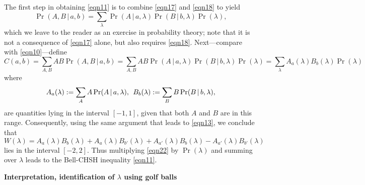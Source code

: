 \documentclass[10pt]{article} %
\def\outl#1{\par{\medskip\noindent\hspace*{.5cm}\bf
      \mathversion{bold}#1\mathversion{normal}\smallskip} }
\def\np{} \def\xa{} \def\xb{} \def\xn{} \def\xp{}
\def\outl#1{} \def\np{} \def\xa{} \def\xb{} \def\xn{} \def\xp{}
\def\outl#1{\par{\medskip\noindent\hspace*{.5cm}\bf
      \mathversion{bold}#1\mathversion{normal}\smallskip} }
\def\np{\newpage }\def\xn{\nopagebreak }\def\xp{\pagebreak }
\newcommand{\hquad}{\mspace{8 mu}}
\newcommand{\vb}{\,|\,}
\newcommand{\lm}{\lambda }
\begin{document}
The first step in obtaining \eqref{eqn11} is to combine
\eqref{eqn17} and \eqref{eqn18} to yield
\begin{equation}
  \Pr(A,B\vb a,b) = \sum_\lm \Pr(A\vb a,\lm) \Pr(B\vb b,\lm) \Pr(\lm),
\label{eqn19}
\end{equation}
which we leave to the reader as an exercise in probability theory; note that
it is not a consequence of \eqref{eqn17} alone, but also requires
\eqref{eqn18}.
%
Next---compare with \eqref{eqn10}---define
\begin{equation}
C(a,b) = \sum_{A,B} AB\Pr(A,B\vb a,b)
  = \sum_{A,B} AB\Pr(A\vb a,\lm)\Pr(B\vb b,\lm) \Pr(\lm)
 = \sum_\lm  A_a(\lm) B_b(\lm) \Pr(\lm)
\label{eqn20}
\end{equation}
where
\begin{equation}
  A_a(\lm) := \sum_A A \Pr(A\vb a,\lm),\hquad
  B_b(\lm) := \sum_B B \Pr(B\vb b,\lm),
\label{eqn21}
\end{equation}
are quantities lying in the interval $[-1,1]$, given that both $A$ and $B$ are
in this range. Consequently, using the same
argument that leads to \eqref{eqn13}, we conclude that
\begin{equation}
  W(\lm) = A_a (\lm)B_b(\lm) +A_a (\lm)B_{b'}(\lm) 
    +A_{a'}(\lm) B_b (\lm)-A_{a'}(\lm) B_{b'}(\lm)
\label{eqn22}
\end{equation}
lies in the interval $[-2,2]$. Thus multiplying \eqref{eqn22} by $\Pr(\lm)$
and summing over $\lm$ leads to the Bell-CHSH inequality \eqref{eqn11}.

\xb
\outl{Interpretation, identification of $\lm$ using golf balls}
\xa
  
\end{document}
